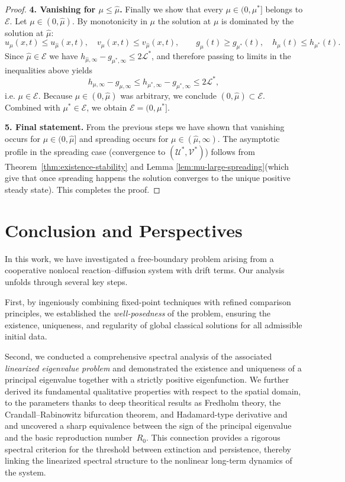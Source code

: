 \documentclass[a4paper,11pt]{amsart}
\theoremstyle{definition}
\numberwithin{equation}{section}
\theoremstyle{definition}
\begin{document}
\begin{proof}
\medskip\noindent\textbf{4. Vanishing for \(\mu\leq\hat\mu\).}
Finally we show that every \(\mu\in(0,\mu^\ast]\) belongs to \(\mathcal E\). Let \(\mu\in(0,\hat\mu)\). By monotonicity in \(\mu\)  the solution at \(\mu\) is dominated by the solution at \(\hat\mu\):
\[
u_\mu(x,t)\leq u_{\hat\mu}(x,t),\quad v_\mu(x,t)\leq v_{\hat\mu}(x,t),
\qquad g_\mu(t)\geq g_{\mu^\ast}(t),\quad h_\mu(t)\leq h_{\mu^\ast}(t).
\]
Since \(\hat\mu\in\mathcal E\) we have \(h_{\hat\mu,\infty}-g_{\mu^\ast,\infty}\leq 2\mathcal L^\ast\), and therefore passing to limits in the inequalities above yields
\[
h_{\mu,\infty}-g_{\mu,\infty}\le h_{\mu^\ast,\infty}-g_{\mu^\ast,\infty}\le 2\mathcal L^\ast,
\]
i.e. \(\mu\in\mathcal E\). Because \(\mu\in(0,\hat\mu)\) was arbitrary, we conclude \((0,\hat\mu)\subset\mathcal E\). Combined with \(\mu^\ast\in\mathcal E\), we obtain \(\mathcal E=(0,\mu^\ast]\).

\medskip\noindent\textbf{5. Final statement.}
From the previous steps we have shown that vanishing occurs for \(\mu\in(0,\hat\mu]\) and spreading occurs for \(\mu\in(\hat\mu,\infty)\). The asymptotic profile in the spreading case (convergence to \((\mathscr U^\ast,\mathscr V^\ast)\)) follows from  Theorem~\eqref{thm:existence-stability}  and Lemma \eqref{lem:mu-large-spreading}(which give that once spreading happens the solution converges to the unique positive steady state). This completes the proof.
\end{proof}



\section*{Conclusion and Perspectives}

In this work, we have investigated a free-boundary problem arising from a cooperative nonlocal reaction–diffusion system with drift terms.
Our analysis unfolds through several key steps.

First, by ingeniously combining fixed-point techniques with refined comparison principles,
we established the \emph{well-posedness} of the problem, ensuring the existence, uniqueness, and regularity of global classical solutions
for all admissible initial data.

Second, we conducted a comprehensive spectral analysis of the associated \emph{linearized eigenvalue problem}
and demonstrated the existence and uniqueness of a principal eigenvalue together with a strictly positive eigenfunction.
We further derived its fundamental qualitative properties with respect to the spatial domain, to the parameters thanks to deep theoritical results as Fredholm theory, the Crandall–Rabinowitz bifurcation theorem, and Hadamard-type derivative \cite{Benguria2024} and
and uncovered a sharp equivalence between the sign of the principal eigenvalue and the basic reproduction number~$R_0$.  This connection provides a rigorous spectral criterion for the threshold between extinction and persistence,
thereby linking the linearized spectral structure to the nonlinear long-term dynamics of the system.
\end{document}
